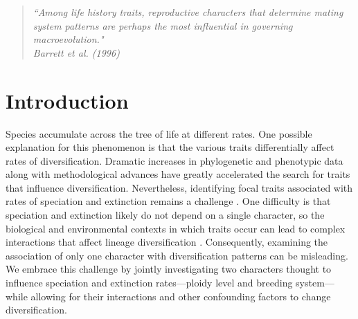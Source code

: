 \begin{quote}
\em{``Among life history traits, reproductive characters that determine mating system patterns are perhaps the most influential in governing macroevolution." 
}
\\
\hspace*{\fill}\rm{ Barrett et al. (1996)}
\end{quote}

\section{Introduction}

Species accumulate across the tree of life at different rates. 
One possible explanation for this phenomenon is that the various traits differentially affect rates of diversification. %
Dramatic increases in phylogenetic and phenotypic data along with methodological advances have greatly accelerated the search for traits that influence diversification. 
Nevertheless, identifying focal traits associated with rates of speciation and extinction remains a challenge \citep[\eg][]{maddison_2015, rabosky_2015, beaulieu_2016, rabosky_2017}. 
One difficulty is that speciation and extinction likely do not depend on a single character, so the biological and environmental contexts in which traits occur can lead to complex interactions that affect lineage diversification \citep{beaulieu_2016, caetano_2018, herrera_2018}.
Consequently, examining the association of only one character with diversification patterns can be misleading. 
We embrace this challenge by jointly investigating two characters thought to influence speciation and extinction rates---ploidy level and breeding system---while allowing for their interactions and other confounding factors to change diversification.

